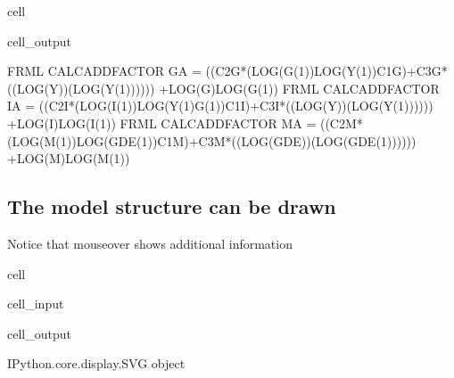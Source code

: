 \documentclass[letterpaper,10pt,english]{jupyterBook}
\begin{document}
\begin{sphinxuseclass}{cell}
\begin{sphinxVerbatimOutput}
\begin{sphinxuseclass}{cell_output}
\begin{sphinxVerbatim}[commandchars=\\\{\}]
FRML \PYGZlt{}CALC\PYGZus{}ADD\PYGZus{}FACTOR\PYGZgt{} G\PYGZus{}A = \PYGZhy{} ((\PYGZhy{}C2\PYGZus{}G*(LOG(G(\PYGZhy{}1))\PYGZhy{}LOG(Y(\PYGZhy{}1))\PYGZhy{}C1\PYGZus{}G)+C3\PYGZus{}G*((LOG(Y))\PYGZhy{}(LOG(Y(\PYGZhy{}1)))))) +LOG(G)\PYGZhy{}LOG(G(\PYGZhy{}1))\PYGZdl{}
FRML \PYGZlt{}CALC\PYGZus{}ADD\PYGZus{}FACTOR\PYGZgt{} I\PYGZus{}A = \PYGZhy{} ((\PYGZhy{}C2\PYGZus{}I*(LOG(I(\PYGZhy{}1))\PYGZhy{}LOG(Y(\PYGZhy{}1)\PYGZhy{}G(\PYGZhy{}1))\PYGZhy{}C1\PYGZus{}I)+C3\PYGZus{}I*((LOG(Y))\PYGZhy{}(LOG(Y(\PYGZhy{}1)))))) +LOG(I)\PYGZhy{}LOG(I(\PYGZhy{}1))\PYGZdl{}
FRML \PYGZlt{}CALC\PYGZus{}ADD\PYGZus{}FACTOR\PYGZgt{} M\PYGZus{}A = \PYGZhy{} ((\PYGZhy{}C2\PYGZus{}M*(LOG(M(\PYGZhy{}1))\PYGZhy{}LOG(GDE(\PYGZhy{}1))\PYGZhy{}C1\PYGZus{}M)+C3\PYGZus{}M*((LOG(GDE))\PYGZhy{}(LOG(GDE(\PYGZhy{}1)))))) +LOG(M)\PYGZhy{}LOG(M(\PYGZhy{}1))\PYGZdl{}
\end{sphinxVerbatim}

\end{sphinxuseclass}\end{sphinxVerbatimOutput}

\end{sphinxuseclass}

\subsection{The model structure can be drawn}
\label{\detokenize{content/howto/smallmodel/modelstart:the-model-structure-can-be-drawn}}
\sphinxAtStartPar
Notice that mouseover shows additional information

\begin{sphinxuseclass}{cell}\begin{sphinxVerbatimInput}

\begin{sphinxuseclass}{cell_input}
\begin{sphinxVerbatim}[commandchars=\\\{\}]
  
\end{sphinxVerbatim}

\end{sphinxuseclass}\end{sphinxVerbatimInput}
\begin{sphinxVerbatimOutput}

\begin{sphinxuseclass}{cell_output}
\begin{sphinxVerbatim}[commandchars=\\\{\}]
\PYGZlt{}IPython.core.display.SVG object\PYGZgt{}
\end{sphinxVerbatim}

\end{sphinxuseclass}\end{sphinxVerbatimOutput}

\end{sphinxuseclass}
\end{document}
